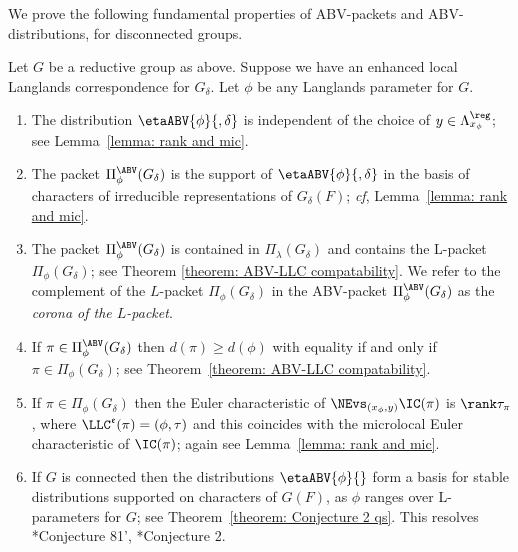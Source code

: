\documentclass[11pt,letterpaper]{amsart}
\numberwithin{equation}{section}
\begin{document}
We prove the following fundamental properties of ABV-packets and ABV-distributions, for disconnected groups.

\begin{theorem}
Let $G$ be a reductive group as above.
Suppose we have an enhanced local Langlands correspondence for $G_\delta$.
Let $\phi$ be any Langlands parameter for $G$.
\begin{enumerate}
    \item 
    The distribution $\etaABV{\phi}{,\delta}$ is independent of the choice of $y\in \Lambda_{x_\phi}^\reg$; see Lemma~\ref{lemma: rank and mic}.
    \item 
    The packet $\Pi^\ABV_\phi(G_\delta)$ is the support of $\etaABV{\phi}{,\delta}$ in the basis of characters of irreducible representations of $G_\delta(F)$; {\it cf}, Lemma~\ref{lemma: rank and mic}.
    \item 
    The packet $\Pi^\ABV_\phi(G_\delta)$ is contained in $\Pi_\lambda(G_\delta)$ and contains the L-packet $\Pi_\phi(G_\delta)$; see Theorem \ref{theorem: ABV-LLC compatability}. We refer to the complement of the $L$-packet $\Pi_\phi(G_\delta)$ in the ABV-packet $\Pi^\ABV_\phi(G_\delta)$ as the {\it corona of the $L$-packet}.
    \item 
    If $\pi \in \Pi_\phi^\ABV(G_\delta)$ then $d(\pi) \geq d(\phi)$ with equality if and only if $\pi \in \Pi_\phi(G_\delta)$; see Theorem~\ref{theorem: ABV-LLC compatability}.
    \item 
    If $\pi \in \Pi_\phi(G_\delta)$ then the Euler characteristic of $\NEvs_{(x_\phi,y)}\IC(\pi)$ is $\rank \tau_\pi$, where $\LLC^\mathfrak{e}(\pi) = (\phi,\tau)$ 
    and this coincides with the microlocal Euler characteristic of $\IC(\pi)$; again see Lemma~\ref{lemma: rank and mic}.
    \item
    If $G$ is connected then the distributions $\etaABV{\phi}{}$ form a basis for stable distributions supported on characters of $G(F)$, as $\phi$ ranges over L-parameters for $G$; see Theorem~\ref{theorem: Conjecture 2 qs}. This resolves \cite{Vog93}*{Conjecture 81'}, \cite{CFK22}*{Conjecture 2}.
\end{enumerate}
\end{theorem}
\end{document}
